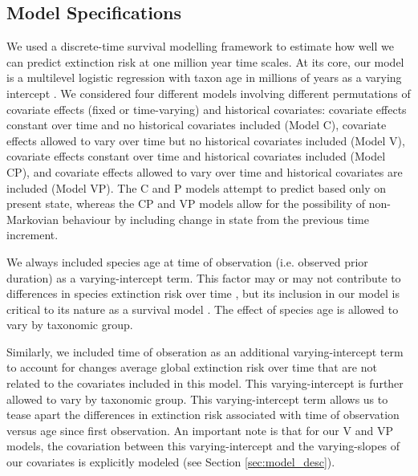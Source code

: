 \documentclass[12pt,letterpaper]{article}
\begin{document}
\begin{refsection}


\subsection{Model Specifications}

We used a discrete-time survival modelling framework to estimate how well we can predict extinction risk at one million year time scales. At its core, our model is a multilevel logistic regression with taxon age in millions of years as a varying intercept \citep{Tutz2016}. We considered four different models involving different permutations of covariate effects (fixed or time-varying) and historical covariates: covariate effects constant over time and no historical covariates included (Model C), covariate effects allowed to vary over time but no historical covariates included (Model V), covariate effects constant over time and historical covariates included (Model CP), and covariate effects allowed to vary over time and historical covariates are included (Model VP). The C and P models attempt to predict based only on present state, whereas the CP and VP models allow for the possibility of non-Markovian behaviour by including change in state from the previous time increment.

We always included species age at time of observation (i.e. observed prior duration) as a varying-intercept term. This factor may or may not contribute to differences in species extinction risk over time \citep{Smits2015,Finnegan2008,Ezard2012,VanValen1973,Liow2011,Crampton2016}, but its inclusion in our model is critical to its nature as a survival model \cite{Tutz2016}. The effect of species age is allowed to vary by taxonomic group. 

Similarly, we included time of obseration as an additional varying-intercept term to account for changes average global extinction risk over time that are not related to the covariates included in this model. This varying-intercept is further allowed to vary by taxonomic group. This varying-intercept term allows us to tease apart the differences in extinction risk associated with time of observation versus age since first observation. An important note is that for our V and VP models, the covariation between this varying-intercept and the varying-slopes of our covariates is explicitly modeled (see Section \ref{sec:model_desc}).


\end{refsection}
\end{document}
